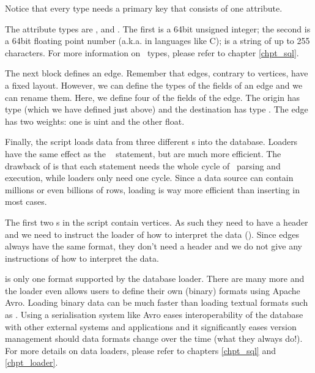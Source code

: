 Notice that every type needs a primary key that consists
of one attribute.

The attribute types are ,  and .
The first is a 64bit unsigned integer;
the second is a 64bit floating point number
(a.k.a.  in languages like C);
 is a string of up to 255  characters.
For more information on \sql\ types, please refer to chapter
\ref{chpt_sql}.

The next block defines an edge. Remember
that edges, contrary to vertices, have a fixed layout.
However, we can define the types of the fields of an edge
and we can rename them. 
Here, we define four of the fields of the edge.
The origin has type  (which we have defined just above)
and the destination has type .
The edge has two weights: one is uint and the other float.

Finally, the script loads data from three different s
into the database. Loaders have the same effect as the \sql\
 statement, but are much more efficient.
The drawback of \term{insert} is that each statement
needs the whole cycle of \sql\ parsing and execution,
while loaders only need one cycle. Since a data source
can contain millions or even billions of rows,
loading is way more efficient than inserting in most cases.

The first two s in the script contain vertices.
As such they need to have a header and we need to instruct
the loader of how to interpret the data ().
Since edges always have the same format, they don't need a header
and we do not give any instructions of how to interpret the data.

 is only one format supported by the database loader.
There are many more and the loader even allows users to define
their own (binary) formats using Apache Avro. Loading binary data 
can be much faster than loading textual formats such as .
Using a serialisation system like Avro eases
interoperability of the database with other
external systems and applications and it
significantly eases version management should data formats
change over the time (what they always do!). 
For more details on data loaders, please refer to chapters
\ref{chpt_sql} and \ref{chpt_loader}.
